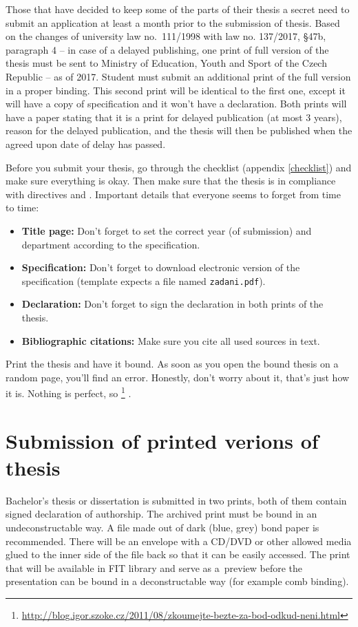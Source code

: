 Those that have decided to keep some of the parts of their thesis a secret need to submit an application at least a month prior to the submission of thesis. Based on the changes of university law no.~111/1998 with law no. 137/2017, \S 47b, paragraph 4 -- in case of a delayed publishing, one print of full version of the thesis must be sent to Ministry of Education, Youth and Sport of the Czech Republic -- as of 2017. Student must submit an additional print of the full version in a proper binding. This second print will be identical to the first one, except it will have a copy of specification and it won't have a declaration. Both prints will have a paper stating that it is a print for delayed publication (at most 3 years), reason for the delayed publication, and the thesis will then be published when the agreed upon date of delay has passed. 

Before you submit your thesis, go through the checklist (appendix \ref{checklist}) and make sure everything is okay. Then make sure that the thesis is in compliance with directives \cite{smernice} and \cite{smerniceFIT}. Important details that everyone seems to forget from time to time:
\begin{itemize}
	\item \textbf{Title page:}  Don't forget to set the correct year (of submission) and department according to the specification.
	\item \textbf{Specification:} Don't forget to download electronic version of the specification (template expects a file named \texttt{zadani.pdf}).
    \item \textbf{Declaration:} Don't forget to sign the declaration in both prints of the thesis.
    \item \textbf{Bibliographic citations:} Make sure you cite all used sources in text.
\end{itemize}

Print the thesis and have it bound. As soon as you open the bound thesis on a random page, you'll find an error. Honestly, don't worry about it, that's just how it is. Nothing is perfect, so \footnote{\url{http://blog.igor.szoke.cz/2011/08/zkoumejte-bezte-za-bod-odkud-neni.html}} \cite{rady}.

\section{Submission of printed verions of thesis}
Bachelor's thesis or dissertation is submitted in two prints, both of them contain signed declaration of authorship. The archived print must be bound in an undeconstructable way. A file made out of dark (blue, grey) bond paper is recommended. There will be an envelope with a CD/DVD or other allowed media glued to the inner side of the file back so that it can be easily accessed. The print that will be available in FIT library and serve as a~preview before the presentation can be bound in a deconstructable way (for example comb binding).

